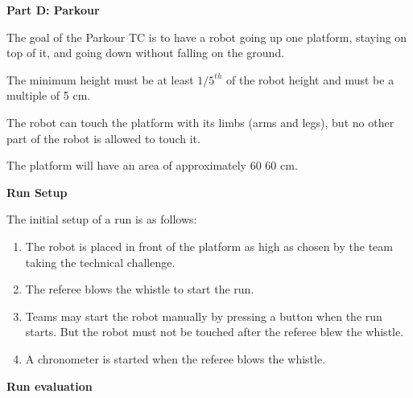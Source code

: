 \clearpage
\sffamily
{\bfseries\color[rgb]{0.4,0.4,0.4} Part D: Parkour}
{}


\bigskip
The goal of the Parkour TC is to have a robot going up one platform, staying on top of it, and going down without falling on the ground.

The minimum height must be at least $1/5^{th}$ of the robot height and must be a multiple of 5 cm.

The robot can touch the platform with its limbs (arms and legs), but no other part of the robot is allowed to touch it.

The platform will have an area of approximately 60 {\texttimes} 60 cm.

\bigskip

{\bfseries Run Setup}

\smallskip

The initial setup of a run is as follows:

\begin{enumerate}

\item The robot is placed in front of the platform as high as chosen by the team taking the technical challenge.

\item The referee blows the whistle to start the run.

\item Teams may start the robot manually by pressing a button when the run starts. But the robot must not be touched after the referee blew the whistle. 

\item A chronometer is started when the referee blows the whistle.
\end{enumerate}

{\bfseries Run evaluation}

\smallskip


